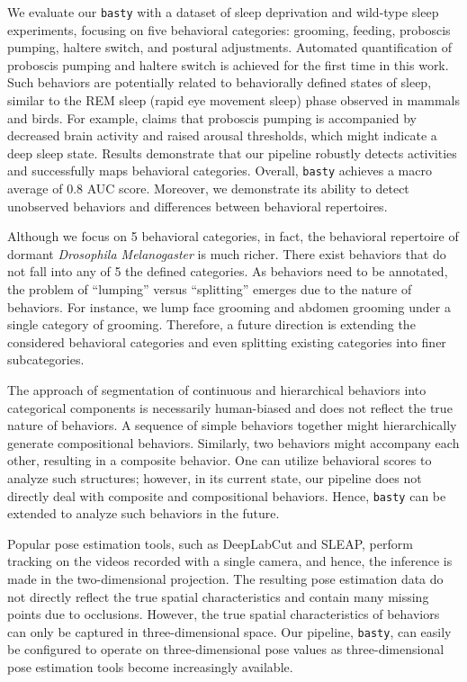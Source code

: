 We evaluate our \texttt{basty} with a dataset of sleep deprivation and wild-type sleep experiments, focusing on five behavioral categories: grooming, feeding, proboscis pumping, haltere switch, and postural adjustments.
Automated quantification of proboscis pumping and haltere switch is achieved for the first time in this work.
Such behaviors are potentially related to behaviorally defined states of sleep, similar to the REM sleep (rapid eye movement sleep) phase observed in mammals and birds.
For example, \citet{van_alphen_deep_2021} claims that proboscis pumping is accompanied by decreased brain activity and raised arousal thresholds, which might indicate a deep sleep state.
Results demonstrate that our pipeline robustly detects activities and successfully maps behavioral categories.
Overall, \texttt{basty} achieves a macro average of 0.8 AUC score.
Moreover, we demonstrate its ability to detect unobserved behaviors and differences between behavioral repertoires.

Although we focus on 5 behavioral categories, in fact, the behavioral repertoire of dormant \textit{Drosophila Melanogaster} is much richer. There exist behaviors that do not fall into any of 5 the defined categories.
As behaviors need to be annotated, the problem of ``lumping'' versus ``splitting'' emerges due to the nature of behaviors. For instance, we lump face grooming and abdomen grooming under a single category of grooming.
Therefore, a future direction is extending the considered behavioral categories and even splitting existing categories into finer subcategories.

The approach of segmentation of continuous and hierarchical behaviors into categorical components is necessarily human-biased and does not reflect the true nature of behaviors.
A sequence of simple behaviors together might hierarchically generate compositional behaviors.
Similarly, two behaviors might accompany each other, resulting in a composite behavior.
One can utilize behavioral scores to analyze such structures; however, in its current state, our pipeline does not directly deal with composite and compositional behaviors.
Hence, \texttt{basty} can be extended to analyze such behaviors in the future.

Popular pose estimation tools, such as DeepLabCut and SLEAP, perform tracking on the videos recorded with a single camera, and hence, the inference is made in the two-dimensional projection.
The resulting pose estimation data do not directly reflect the true spatial characteristics and contain many missing points due to occlusions.
However, the true spatial characteristics of behaviors can only be captured in three-dimensional space.
Our pipeline, \texttt{basty}, can easily be configured to operate on three-dimensional pose values as three-dimensional pose estimation tools become  increasingly available.